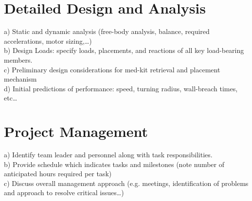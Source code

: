 \documentclass[12pt]{article}
\begin{document}
\section{Detailed Design and Analysis}
a) Static and dynamic analysis (free-body analysis, balance, required accelerations, motor sizing,…)\\
b) Design Loads: specify loads, placements, and reactions of all key load-bearing members.\\
c) Preliminary design considerations for med-kit retrieval and placement mechanism\\
d) Initial predictions of performance: speed, turning radius, wall-breach times, etc…


\section{Project Management}
a) Identify team leader and personnel along with task responsibilities.\\
b) Provide schedule which indicates tasks and milestones (note number of anticipated hours required per task)\\
c) Discuss overall management approach (e.g. meetings, identification of problems and approach to resolve critical issues…)
\end{document}
